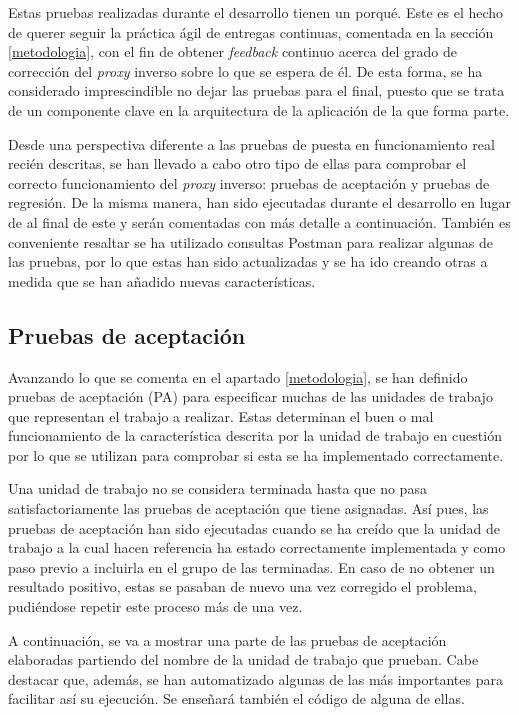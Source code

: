 \documentclass[11pt,spanish,listoffigures]{tfgetsinf}
\begin{document}
Estas pruebas realizadas durante el desarrollo tienen un porqué. Este es el hecho de querer seguir la práctica ágil de entregas continuas, comentada en la sección \ref{metodologia}, con el fin de obtener \emph{feedback} continuo acerca del grado de corrección del \emph{proxy} inverso sobre lo que se espera de él. De esta forma, se ha considerado imprescindible no dejar las pruebas para el final, puesto que se trata de un componente clave en la arquitectura de la aplicación de la que forma parte.

Desde una perspectiva diferente a las pruebas de puesta en funcionamiento real recién descritas, se han llevado a cabo otro tipo de ellas para comprobar el correcto funcionamiento del \emph{proxy} inverso: pruebas de aceptación y pruebas de regresión. De la misma manera, han sido ejecutadas durante el desarrollo en lugar de al final de este y serán comentadas con más detalle a continuación. También es conveniente resaltar se ha utilizado consultas Postman para realizar algunas de las pruebas, por lo que estas han sido actualizadas y se ha ido creando otras a medida que se han añadido nuevas características.


		\subsection{Pruebas de aceptación} \label{pruebasDeAceptacion}

Avanzando lo que se comenta en el apartado \ref{metodologia}, se han definido pruebas de aceptación (PA) para especificar muchas de las unidades de trabajo que representan el trabajo a realizar. Estas determinan el buen o mal funcionamiento de la característica descrita por la unidad de trabajo en cuestión por lo que se utilizan para comprobar si esta se ha implementado correctamente.

Una unidad de trabajo no se considera terminada hasta que no pasa satisfactoriamente las pruebas de aceptación que tiene asignadas. Así pues, las pruebas de aceptación han sido ejecutadas cuando se ha creído que la unidad de trabajo a la cual hacen referencia ha estado correctamente implementada y como paso previo a incluirla en el grupo de las terminadas. En caso de no obtener un resultado positivo, estas se pasaban de nuevo una vez corregido el problema, pudiéndose repetir este proceso más de una vez.

A continuación, se va a mostrar una parte de las pruebas de aceptación elaboradas partiendo del nombre de la unidad de trabajo que prueban. Cabe destacar que, además, se han automatizado algunas de las más importantes para facilitar así su ejecución. Se enseñará también el código de alguna de ellas.
\end{document}

